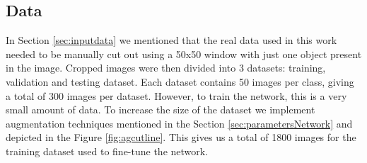 \subsection{Data}

In Section \ref{sec:inputdata} we mentioned that the real data used in this work needed to be manually cut out using a 50x50 window with just one object present in the image. Cropped images were then divided into 3 datasets: training, validation and testing dataset. Each dataset contains 50 images per class, giving a total of 300 images per dataset. However, to train the network, this is a very small amount of data. 
To increase the size of the dataset we implement augmentation techniques mentioned in the Section \ref{sec:parametersNetwork} and depicted in the Figure \ref{fig:agcutline}. This gives us a total of 1800 images for the training dataset used to fine-tune the network. 

